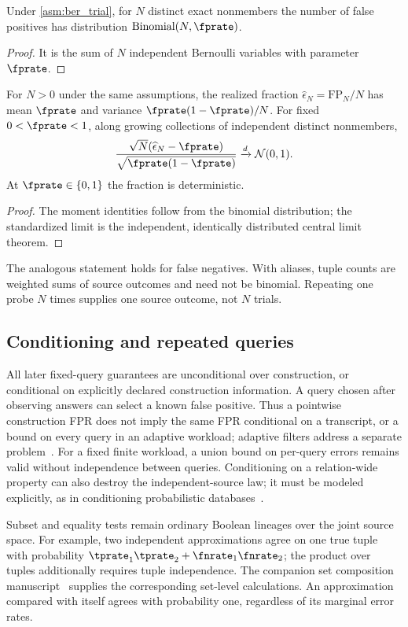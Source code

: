 \documentclass[../main.tex]{subfiles}
\begin{document}
\begin{theorem}
\label{thm:fpbinom}
Under \cref{asm:ber_trial}, for $N$ distinct exact nonmembers the number of
false positives has distribution $\mathrm{Binomial}(N,\fprate)$.
\end{theorem}
\begin{proof}
It is the sum of $N$ independent Bernoulli variables with parameter $\fprate$.
\end{proof}
\begin{theorem}
\label{thm:fpr}
For $N>0$ under the same assumptions, the realized fraction
$\widehat\epsilon_N=\mathrm{FP}_N/N$ has mean $\fprate$ and variance
$\fprate(1-\fprate)/N$. For fixed $0<\fprate<1$, along growing collections
of independent distinct nonmembers,
\[
 \frac{\sqrt N(\widehat\epsilon_N-\fprate)}
 {\sqrt{\fprate(1-\fprate)}}\xrightarrow{d}\mathcal N(0,1).
\]
At $\fprate\in\{0,1\}$ the fraction is deterministic.
\end{theorem}
\begin{proof}
The moment identities follow from the binomial distribution; the standardized
limit is the independent, identically distributed central limit theorem.
\end{proof}
The analogous statement holds for false negatives. With aliases, tuple
counts are weighted sums of source outcomes and need not be binomial.
Repeating one probe $N$ times supplies one source outcome, not $N$ trials.

\subsection{Conditioning and repeated queries}
All later fixed-query guarantees are unconditional over construction, or
conditional on explicitly declared construction information. A query chosen
after observing answers can select a known false positive. Thus a pointwise
construction FPR does not imply the same FPR conditional on a transcript, or
a bound on every query in an adaptive workload; adaptive filters address a
separate problem~\cite{bender2017adaptivity}. For a fixed finite workload, a
union bound on per-query errors remains valid without independence between
queries. Conditioning on a relation-wide property can also destroy the
independent-source law; it must be modeled explicitly, as in conditioning
probabilistic databases~\cite{koch2008conditioning}.

Subset and equality tests remain ordinary Boolean lineages over the joint
source space. For example, two independent approximations agree on one true
tuple with probability $\tprate_1\tprate_2+\fnrate_1\fnrate_2$; the product
over tuples additionally requires tuple independence. The companion set
composition manuscript~\cite{bernoulliComposition} supplies the corresponding
set-level calculations. An approximation compared with itself agrees with
probability one, regardless of its marginal error rates.
\end{document}
